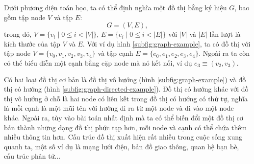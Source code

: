 Dưới phương diện toán học, ta có thể định nghĩa một đồ thị bằng ký hiệu $G$, bao gồm tập node $V$ và tập $E$:
\begin{equation}
    G = (V, E),
\end{equation}
trong đó, $V = \{v_i \; | \; 0 \leq i < |V|\}$, $E = \{e_i \; | \; 0 \leq i < |E|\}$ với $|V|$ và $|E|$ lần lượt là kích thước của tập $V$ và $E$. Với ví dụ hình \ref{subfig:graph-example}, ta có đồ thị với tập node $V = \{v_0, v_1, v_2, v_3, v_4\}$ và tập cạnh $E = \{e_0, e_1, e_2, e_3, e_4\}$. Ngoài ra ta còn có thể biểu diễn một cạnh bằng cặp node mà nó kết nối, ví dụ $e_3 \equiv (v_2, v_3)$.

Có hai loại đồ thị cơ bản là đồ thị vô hướng (hình \ref{subfig:graph-example}) và đồ thị có hướng (hình \ref{subfig:graph-directed-example}). Đồ thị có hướng khác với đồ thị vô hướng ở chỗ là hai node có liên kết trong đồ thị có hướng có thứ tự, nghĩa là mỗi cạnh là một mũi tên với hướng đi ra từ một node và đi vào một node khác. Ngoài ra, tùy vào bài toán nhất định mà ta có thể biến đổi một đồ thị cơ bản thành những dạng đồ thị phức tạp hơn, mỗi node và cạnh có thể chứa thêm nhiều thông tin hơn. Cấu trúc đồ thị xuất hiện rất nhiều trong cuộc sống xung quanh ta, một số ví dụ là mạng lưới điện, bản đồ giao thông, quan hệ bạn bè, cấu trúc phân tử...

